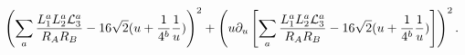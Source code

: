 \begin{equation*}
\left(\sum_a \frac{L^a_1L^a_2{\cal L}^a_3}{R_AR_B}-16\sqrt{2}( u+\frac{1}{4^b}\frac{1}{u})\right)^2
+\left(u\partial_u\left[\sum_a
    \frac{L^a_1L^a_2{\cal L}^a_3}{R_AR_B}
-16\sqrt{2}( u+\frac{1}{4^b}\frac{1}{u})\right]\right)^2.
\end{equation*}


